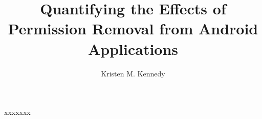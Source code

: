 


\title{Quantifying the Effects of Permission Removal from Android Applications}
\author{Kristen M. Kennedy}










\begin{frontmatter}
\maketitle

\copyrightpage


\newpage
   \begin{inlineabstract}
	\begin{small}
	\myabstract
	\end{small}
		
   \end{inlineabstract}
\begin{acknowledgments}
xxxxxxx
\end{acknowledgments}    




\tableofcontents
\listoffigures
\begingroup
\let\clearpage\relax
\listoftables
\endgroup



\end{frontmatter}

